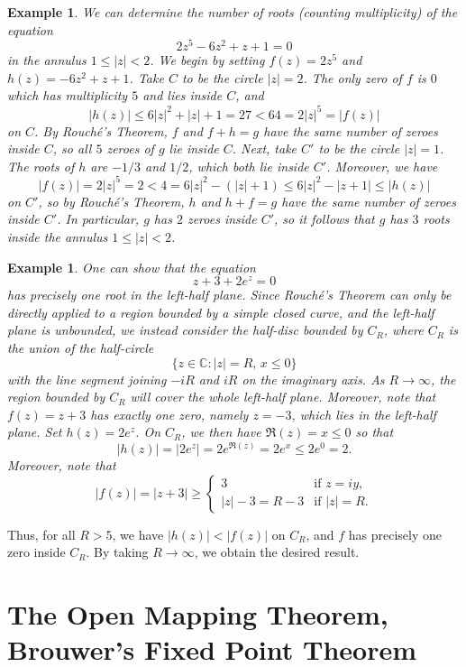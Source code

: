 \documentclass[10pt]{article}
\newcommand{\C}{\mathbb{C}}
\theoremstyle{newstyle}
\newtheorem{exmp}[thm]{Example}
\begin{document}
\begin{exmp}
We can determine the number of roots (counting multiplicity) of the equation 
\[ 2z^5 - 6z^2 + z + 1 = 0 \]
in the annulus $1 \leq |z| < 2$. We begin by setting $f(z) = 2z^5$ and $h(z) = -6z^2 + z + 1$. 
Take $C$ to be the circle $|z| = 2$. The only zero of $f$ is $0$ which has multiplicity $5$ and lies inside
$C$, and 
\[ |h(z)| \leq 6|z|^2 + |z| + 1 = 27 < 64 = 2|z|^5 = |f(z)| \]
on $C$. By Rouch\'e's Theorem, $f$ and $f+h=g$ have the same number of zeroes inside $C$, so all 
$5$ zeroes of $g$ lie inside $C$. Next, take $C'$ to be the circle $|z| = 1$. The roots 
of $h$ are $-1/3$ and $1/2$, which both lie inside $C'$. Moreover, we have 
\[ |f(z)| = 2|z|^5 = 2 < 4 = 6|z|^2 - (|z| + 1) \leq 6|z|^2 - |z+1| \leq |h(z)| \] 
on $C'$, so by Rouch\'e's Theorem, $h$ and $h+f=g$ have the same number of zeroes inside $C'$. 
In particular, $g$ has $2$ zeroes inside $C'$, so it follows that $g$ has $3$ roots inside the 
annulus $1 \leq |z| < 2$. 
\end{exmp}

\begin{exmp}
One can show that the equation
\[ z + 3 + 2e^z = 0 \]
has precisely one root in the left-half plane. Since Rouch\'e's Theorem can only be directly 
applied to a region bounded by a simple closed curve, and the left-half plane is unbounded, 
we instead consider the half-disc bounded by $C_R$, where $C_R$ is the union of the 
half-circle 
\[ \{z \in \C : |z| = R,\, x \leq 0\} \]
with the line segment joining $-iR$ and $iR$ on the imaginary axis. As $R \to \infty$, 
the region bounded by $C_R$ will cover the whole left-half plane. Moreover, note that 
$f(z) = z+3$ has exactly one zero, namely $z = -3$, which lies in the left-half plane. 
Set $h(z) = 2e^z$. On $C_R$, we then have $\Re(z) = x \leq 0$ so that 
\[ |h(z)| = |2e^z| = 2e^{\Re(z)} = 2e^x \leq 2e^0 = 2. \]
Moreover, note that 
\[ |f(z)| = |z+3| \geq \begin{cases} 3 & \text{if } z = iy, \\ 
|z| - 3 = R - 3 & \text{if } |z| = R. \end{cases} \]
\end{exmp}
Thus, for all $R > 5$, we have $|h(z)| < |f(z)|$ on $C_R$, and $f$ has precisely one zero inside 
$C_R$. By taking $R \to \infty$, we obtain the desired result. 

\newpage 
\section{The Open Mapping Theorem, Brouwer's Fixed Point Theorem}
\end{document}
